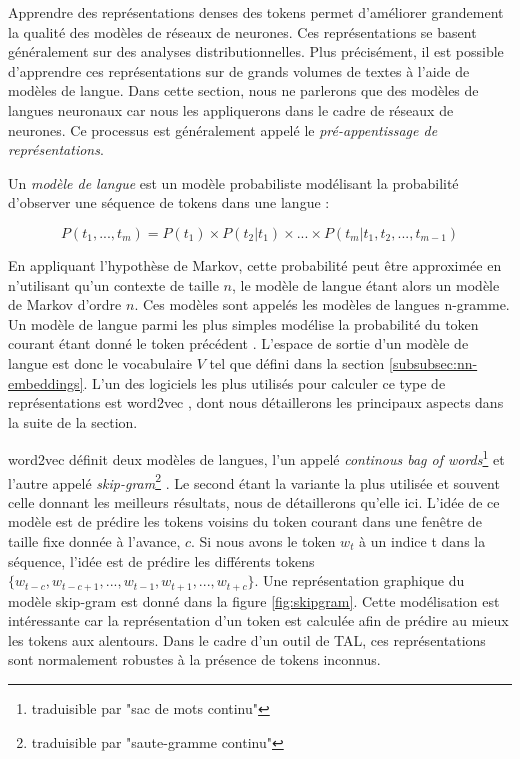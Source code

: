 \documentclass[citation\_needed]{subfiles}
\begin{document}
Apprendre des représentations denses des tokens permet d'améliorer grandement la qualité des modèles de réseaux de neurones. Ces représentations se basent généralement sur des analyses distributionnelles. Plus précisément, il est possible d'apprendre ces représentations sur de grands volumes de textes à l'aide de modèles de langue. Dans cette section, nous ne parlerons que des modèles de langues neuronaux car nous les appliquerons dans le cadre de réseaux de neurones. Ce processus est généralement appelé le \emph{pré-appentissage de représentations}.

Un \emph{modèle de langue} est un modèle probabiliste modélisant la probabilité d'observer une séquence de tokens dans une langue :

\begin{equation}\label{eq:language-model}
P(t_{1},...,t_{m}) = P(t_{1}) \times P(t_{2}|t_{1}) \times ... \times P(t_{m} | t_{1}, t_{2}, ..., t_{m-1})
\end{equation}

En appliquant l'hypothèse de Markov, cette probabilité peut être approximée en n'utilisant qu'un contexte de taille $n$, le modèle de langue étant alors un modèle de Markov d'ordre $n$. Ces modèles sont appelés les modèles de langues n-gramme. Un modèle de langue parmi les plus simples modélise la probabilité du token courant étant donné le token précédent \citep{bengio2003neural}. L'espace de sortie d'un modèle de langue est donc le vocabulaire $V$ tel que défini dans la section \ref{subsubsec:nn-embeddings}. L'un des logiciels les plus utilisés pour calculer ce type de représentations est word2vec \citep{mikolov2013efficient,mikolov2013distributed}, dont nous détaillerons les principaux aspects dans la suite de la section.

word2vec définit deux modèles de langues, l'un appelé \textit{continous bag of words}\footnote{traduisible par "sac de mots continu"} et l'autre appelé \textit{skip-gram}\footnote{traduisible par "saute-gramme continu"} \citep{mikolov2013efficient}. Le second étant la variante la plus utilisée et souvent celle donnant les meilleurs résultats, nous de détaillerons qu'elle ici. L'idée de ce modèle est de prédire les tokens voisins du token courant dans une fenêtre de taille fixe donnée à l'avance, $c$. Si nous avons le token $w_{t}$ à un indice t dans la séquence, l'idée est de prédire les différents tokens $\{w_{t-c},w_{t-c+1},...,w_{t-1},w_{t+1},...,w_{t+c}\}$. Une représentation graphique du modèle skip-gram est donné dans la figure \ref{fig:skipgram}. Cette modélisation est intéressante car la représentation d'un token est calculée afin de prédire au mieux les tokens aux alentours. Dans le cadre d'un outil de TAL, ces représentations sont normalement robustes à la présence de tokens inconnus.
\end{document}
